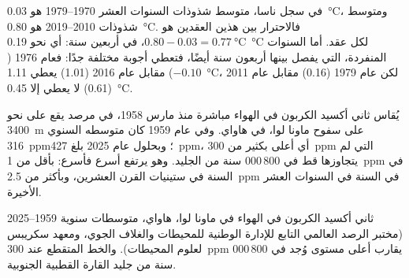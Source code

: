 \begin{example}
في سجل ناسا، متوسط شذوذات السنوات العشر 1970--1979 هو
\qty{0.03}{\degreeCelsius}، ومتوسط شذوذات 2010--2019 هو
\qty{0.80}{\degreeCelsius}. فالاحترار بين هذين العقدين هو
$0.80 - 0.03 = \qty{0.77}{\degreeCelsius}$، في أربعين سنة: أي نحو
\qty{0.19}{\degreeCelsius} لكل عقد. أما السنوات المنفردة، التي يفصل بينها أربعون
سنة أيضًا، فتعطي أجوبة مختلفة جدًا: فعام 1976 ($-0.10$) مقابل عام 2016
(1.01) يعطي \qty{1.11}{\degreeCelsius}، لكن عام 1979 (0.16) مقابل عام 2011
(0.61) لا يعطي إلا \qty{0.45}{\degreeCelsius}.
\end{example}

يُقاس ثاني أكسيد الكربون في الهواء مباشرة منذ مارس 1958، في مرصد يقع على 
نحو \qty{3400}{m} على سفوح  ماونا لوا، في هاواي. وفي عام 1959 كان متوسطه
السنوي \qty{316}{ppm}؛ وبحلول عام 2025 بلغ \qty{427}{ppm}، أي أعلى بكثير من
\qty{300}{ppm} التي لم يتجاوزها قط في 800\,000 سنة من الجليد. وهو يرتفع أسرع
فأسرع: بأقل من \qty{1}{ppm} في السنة في ستينيات القرن العشرين، وبأكثر من
\qty{2.5}{ppm} في السنة في السنوات العشر الأخيرة.

\begin{omfigure}

{\small ثاني أكسيد الكربون في الهواء في ماونا لوا، هاواي، متوسطات سنوية
1959--2025 (مختبر الرصد العالمي التابع للإدارة الوطنية للمحيطات والغلاف الجوي،
ومعهد سكريبس لعلوم المحيطات). والخط المتقطع عند \qty{300}{ppm} يقارب أعلى مستوى
وُجد في 800\,000 سنة من جليد القارة القطبية الجنوبية.}
\label{fig:g9:climate-past-and-present:co2}
\end{omfigure}

